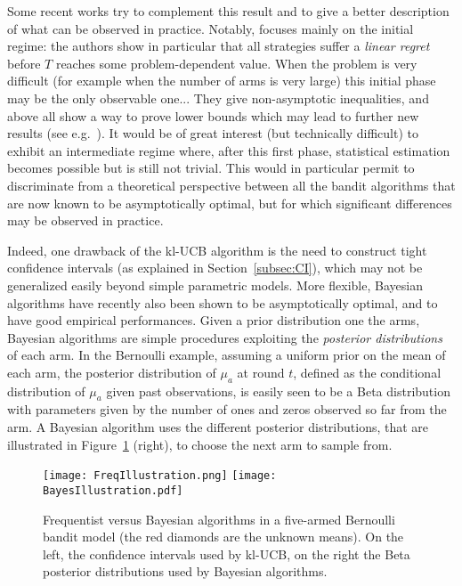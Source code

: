 \documentclass[proc]{edpsmath}
\begin{document}
	Some recent works try to complement this result and to give a better description of what can be observed in practice. Notably, \cite{GMS16} focuses mainly on the initial regime: the authors show in particular that all strategies suffer a \emph{linear regret} before $T$ reaches some problem-dependent value. When the problem is very difficult (for example when the number of arms is very large) this initial phase may be the only observable one... They give non-asymptotic inequalities, and above all show a way to prove lower bounds which may lead to further new results (see e.g.~\cite{GKL16}).  
	It would be of great interest (but technically difficult) to exhibit an intermediate regime where, after this first phase, statistical estimation becomes possible but is still not trivial. This would in particular permit to discriminate from  a theoretical perspective between all the bandit algorithms that are now known to be asymptotically optimal, but for which significant differences may be observed in practice.
	
	Indeed, one drawback of the kl-UCB algorithm is the need to construct tight confidence intervals (as explained in Section~\ref{subsec:CI}), which may not be generalized easily beyond simple parametric models. More flexible, Bayesian algorithms have recently also been shown to be asymptotically optimal, and to have good empirical performances. 
	Given a prior distribution one the arms, Bayesian algorithms are simple procedures exploiting the \emph{posterior distributions} of each arm. In the Bernoulli example, assuming a uniform prior on the mean of each arm, the posterior distribution of $\mu_a$ at round $t$, defined as the conditional distribution of $\mu_a$ given past observations, is easily seen to be a Beta distribution with parameters given by the number of ones and zeros observed so far from the arm. A Bayesian algorithm uses the different posterior distributions, that are illustrated in Figure~\ref{fig:IllustrationAlgos} (right), to choose the next arm to sample from. 
	
	\begin{figure}[h]
		\centering
		\texttt{[image: FreqIllustration.png]}
		\texttt{[image: BayesIllustration.pdf]}
		\caption{\label{fig:IllustrationAlgos} Frequentist versus Bayesian algorithms in a five-armed Bernoulli bandit model (the red diamonds are the unknown means). On the left, the confidence intervals used by kl-UCB, on the right the Beta posterior distributions used by Bayesian algorithms.}
	\end{figure}
	
\end{document}
